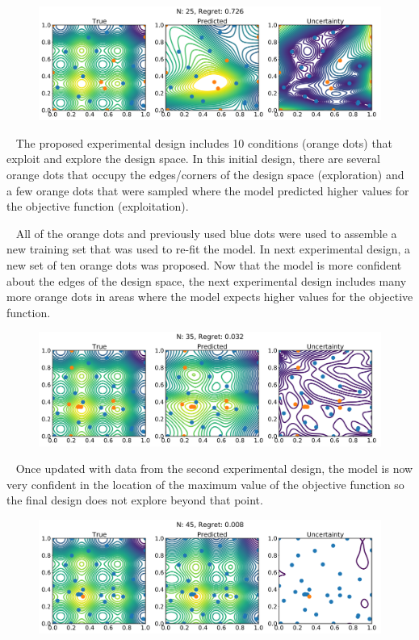 \documentclass[11pt]{article} %
\begin{document}
\begin{figure}[h!]
\centering
\includegraphics[width=7.5in]{Figures/Cosines_DTL_0.pdf}
\end{figure} 
~\newline
The proposed experimental design includes 10 conditions (orange dots) that exploit and explore the design space. In this initial design, there are several orange dots that occupy the edges/corners of the design space (exploration) and a few orange dots that were sampled where the model predicted higher values for the objective function (exploitation).    

\clearpage
~\newline
All of the orange dots and previously used blue dots were used to assemble a new training set that was used to re-fit the model. In next experimental design, a new set of ten orange dots was proposed. Now that the model is more confident about the edges of the design space, the next experimental design includes many more orange dots in areas where the model expects higher values for the objective function. 

\begin{figure}[h!]
\centering
\includegraphics[width=7.5in]{Figures/Cosines_DTL_1.pdf}
\end{figure} 

~\newline 
Once updated with data from the second experimental design, the model is now very confident in the location of the maximum value of the objective function so the final design does not explore beyond that point. 

\begin{figure}[h!]
\centering
\includegraphics[width=7.5in]{Figures/Cosines_DTL_2.pdf}
\end{figure} 
~\newline
\end{document}
